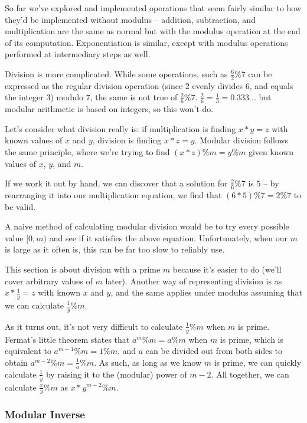 So far we've explored and implemented operations that seem fairly similar to how they'd be implemented without modulus -- addition, subtraction, and multiplication are the same as normal but with the modulus operation at the end of its computation. Exponentiation is similar, except with modulus operations performed at intermediary steps as well.

Division is more complicated. While some operations, such as $\frac{6}{2} \% 7$ can be expressed as the regular division operation (since 2 evenly divides 6, and equals the integer 3) modulo 7, the same is not true of $\frac{2}{6} \% 7$. $\frac{2}{6} = \frac{1}{3} = 0.333...$ but modular arithmetic is based on integers, so this won't do.

Let's consider what division really is: if multiplication is finding $x * y = z$ with known values of $x$ and $y$, division is finding $x * z = y$. Modular division follows the same principle, where we're trying to find $(x * z) \% m = y \% m$ given known values of $x$, $y$, and $m$.

If we work it out by hand, we can discover that a solution for $\frac{2}{6} \% 7$ is $5$ -- by rearranging it into our multiplication equation, we find that $(6 * 5) \% 7 = 2 \% 7$ to be valid.

A naive method of calculating modular division would be to try every possible value $[0, m)$ and see if it satisfies the above equation. Unfortunately, when our $m$ is large as it often is, this can be far too slow to reliably use.

This section is about division with a prime $m$ because it's easier to do (we'll cover arbitrary values of $m$ later). Another way of representing division is as $x * \frac{1}{y} = z$ with known $x$ and $y$, and the same applies under modulus assuming that we can calculate $\frac{1}{y} \% m$.

As it turns out, it's not very difficult to calculate $\frac{1}{y} \% m$ when $m$ is prime. Fermat's little theorem states that $a^m \% m = a \% m$ when $m$ is prime, which is equivalent to $a^{m-1} \% m = 1 \% m$, and $a$ can be divided out from both sides to obtain $a^{m-2} \% m = \frac{1}{a} \% m$. As such, as long as we know $m$ is prime, we can quickly calculate $\frac{1}{y}$ by raising it to the (modular) power of $m-2$. All together, we can calculate $\frac{x}{y} \% m$ as $x * y^{m-2} \% m$.

\subsubsection{Modular Inverse}

